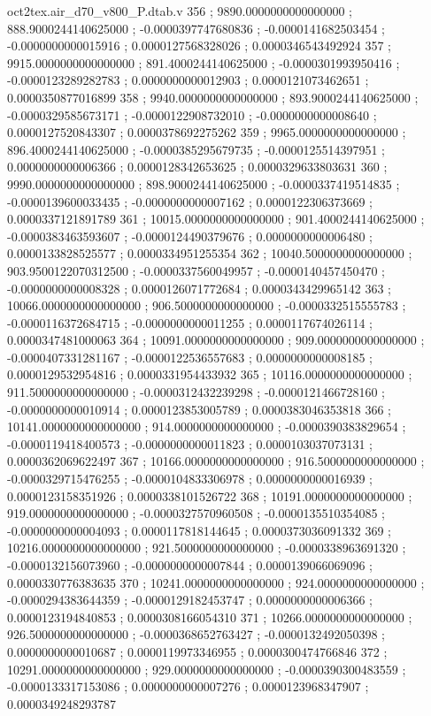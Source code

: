 \begin{filecontents}[overwrite]{oct2tex.air_d70_v800_P.dtab.v}
356 ; 9890.0000000000000000 ; 888.9000244140625000 ; -0.0000397747680836 ; -0.0000141682503454 ; -0.0000000000015916 ; 0.0000127568328026 ; 0.0000346543492924
357 ; 9915.0000000000000000 ; 891.4000244140625000 ; -0.0000301993950416 ; -0.0000123289282783 ; 0.0000000000012903 ; 0.0000121073462651 ; 0.0000350877016899
358 ; 9940.0000000000000000 ; 893.9000244140625000 ; -0.0000329585673171 ; -0.0000122908732010 ; -0.0000000000008640 ; 0.0000127520843307 ; 0.0000378692275262
359 ; 9965.0000000000000000 ; 896.4000244140625000 ; -0.0000385295679735 ; -0.0000125514397951 ; 0.0000000000006366 ; 0.0000128342653625 ; 0.0000329633803631
360 ; 9990.0000000000000000 ; 898.9000244140625000 ; -0.0000337419514835 ; -0.0000139600033435 ; -0.0000000000007162 ; 0.0000122306373669 ; 0.0000337121891789
361 ; 10015.0000000000000000 ; 901.4000244140625000 ; -0.0000383463593607 ; -0.0000124490379676 ; 0.0000000000006480 ; 0.0000133828525577 ; 0.0000334951255354
362 ; 10040.5000000000000000 ; 903.9500122070312500 ; -0.0000337560049957 ; -0.0000140457450470 ; -0.0000000000008328 ; 0.0000126071772684 ; 0.0000343429965142
363 ; 10066.0000000000000000 ; 906.5000000000000000 ; -0.0000332515555783 ; -0.0000116372684715 ; -0.0000000000011255 ; 0.0000117674026114 ; 0.0000347481000063
364 ; 10091.0000000000000000 ; 909.0000000000000000 ; -0.0000407331281167 ; -0.0000122536557683 ; 0.0000000000008185 ; 0.0000129532954816 ; 0.0000331954433932
365 ; 10116.0000000000000000 ; 911.5000000000000000 ; -0.0000312432239298 ; -0.0000121466728160 ; -0.0000000000010914 ; 0.0000123853005789 ; 0.0000383046353818
366 ; 10141.0000000000000000 ; 914.0000000000000000 ; -0.0000390383829654 ; -0.0000119418400573 ; -0.0000000000011823 ; 0.0000103037073131 ; 0.0000362069622497
367 ; 10166.0000000000000000 ; 916.5000000000000000 ; -0.0000329715476255 ; -0.0000104833306978 ; 0.0000000000016939 ; 0.0000123158351926 ; 0.0000338101526722
368 ; 10191.0000000000000000 ; 919.0000000000000000 ; -0.0000327570960508 ; -0.0000135510354085 ; -0.0000000000004093 ; 0.0000117818144645 ; 0.0000373036091332
369 ; 10216.0000000000000000 ; 921.5000000000000000 ; -0.0000338963691320 ; -0.0000132156073960 ; -0.0000000000007844 ; 0.0000139066069096 ; 0.0000330776383635
370 ; 10241.0000000000000000 ; 924.0000000000000000 ; -0.0000294383644359 ; -0.0000129182453747 ; 0.0000000000006366 ; 0.0000123194840853 ; 0.0000308166054310
371 ; 10266.0000000000000000 ; 926.5000000000000000 ; -0.0000368652763427 ; -0.0000132492050398 ; 0.0000000000010687 ; 0.0000119973346955 ; 0.0000300474766846
372 ; 10291.0000000000000000 ; 929.0000000000000000 ; -0.0000390300483559 ; -0.0000133317153086 ; 0.0000000000007276 ; 0.0000123968347907 ; 0.0000349248293787

\end{filecontents}
